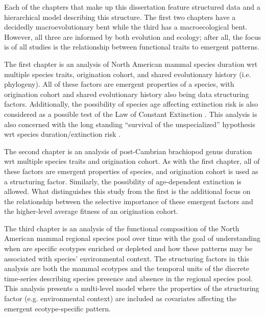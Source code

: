 Each of the chapters that make up this dissertation feature structured data and a hierarchical model describing this structure. The first two chapters have a decidedly macroevolutionary bent while the third has a macroecological bent. However, all three are informed by both evolution and ecology; after all, the focus is of all studies is the relationship between functional traits to emergent patterns.

The first chapter is an analysis of North American mammal species duration wrt multiple species traits, origination cohort, and shared evolutionary history (i.e. phylogeny). All of these factors are emergent properties of a species, with origination cohort and shared evolutionary history also being data structuring factors. Additionally, the possibility of species age affecting extinction risk is also considered as a possible test of the Law of Constant Extinction \citep{VanValen1973}. This analysis is also concerned with the long standing ``survival of the unspecialized'' hypothesis wrt species duration/extinction risk \citep{Simpson1944}.

The second chapter is an analysis of post-Cambrian brachiopod genus duration wrt multiple species traits and origination cohort. As with the first chapter, all of these factors are emergent properties of species, and origination cohort is used as a structuring factor. Similarly, the possibility of age-dependent extinction is allowed. What distinguishes this study from the first is the additional focus on the relationship between the selective importance of these emergent factors and the higher-level average fitness of an origination cohort.

The third chapter is an analysis of the functional composition of the North American mammal regional species pool over time with the goal of understanding when are specific ecotypes enriched or depleted and how these patterns may be associated with species' environmental context. The structuring factors in this analysis are both the mammal ecotypes and the temporal units of the discrete time-series describing species presence and absence in the regional species pool. This analysis presents a multi-level model where the properties of the structuring factor (e.g. environmental context) are included as covariates affecting the emergent ecotype-specific pattern. 



